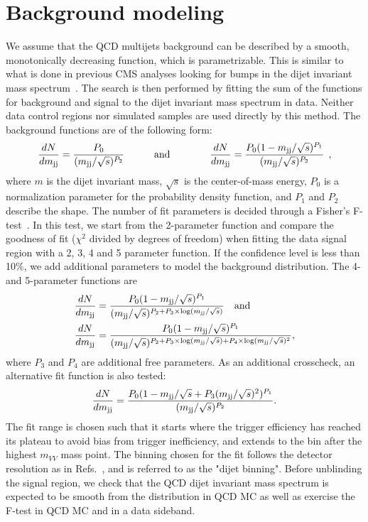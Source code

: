 \section{Background modeling}
\label{sec:searchI:bkg}
We assume that the QCD multijets background can be described by a smooth, monotonically decreasing function, which is parametrizable. This is similar to what is done in previous CMS analyses looking for bumps in the dijet invariant mass spectrum~\cite{Chatrchyan:2012ypy,CMS-PAS-EXO-12-059}. The search is then performed by fitting the sum of the functions for background and signal to the dijet invariant mass spectrum in data. Neither data control regions nor simulated samples are used directly by this method. The background functions are of the following form:
\begin{equation}
\label{eq:dijet1}
\frac{dN}{dm_\mathrm{jj}}= \frac{ P_0 } { (m_\mathrm{jj}/\sqrt{s})^{P_2} }\quad\quad\quad{\rm and}
\quad\quad\quad\quad
\frac{dN}{dm_\mathrm{jj}}= \frac{ P_0(1-m_\mathrm{jj}/\sqrt{s})^{P_1} } { (m_\mathrm{jj}/\sqrt{s})^{P_2} }\:\:,
\end{equation}
where $m$ is the dijet invariant mass, $\sqrt{s}$ is the center-of-mass energy, $P_0$ is a normalization parameter for the probability density function, and $P_1$ and $ P_2$ describe the shape. The number of fit parameters is decided through a Fisher's F-test~\cite{RePEc:bla:istatr:v:80:y:2012:i:3:p:491-491}. In this test, we start from the 2-parameter function and compare the goodness of fit ($\chi^2$ divided by degrees of freedom) when fitting the data signal region with a 2, 3, 4 and 5 parameter function. If the confidence level is less than 10\%, we add additional parameters to model the background distribution. The 4- and 5-parameter functions are
\begin{align}
\label{eq:dijet2}
\frac{dN}{d m_\mathrm{jj}} &= \frac{ P_0(1-m_\mathrm{jj}/\sqrt{s})^{P_1} } {(m_\mathrm{jj}/\sqrt{s})^{P_2+P_3\times\log(m_\mathrm{jj}/\sqrt{s})} }\quad{\rm and}\\
\frac{dN}{d m_\mathrm{jj}} &= \frac{ P_0(1-m_\mathrm{jj}/\sqrt{s})^{P_1} } {(m_\mathrm{jj}/\sqrt{s})^{P_2+P_3\times\log(m_\mathrm{jj}/\sqrt{s})+P_4\times\log(m_\mathrm{jj}/\sqrt{s})^2} },
\end{align}
where $P_3$ and $P_4$ are additional free parameters. As an additional crosscheck, an alternative fit function is also tested:
\begin{equation}
\label{eq:dijet4}
\frac{dN}{dm_\mathrm{jj}} = \frac{ P_0(1-m_\mathrm{jj} / \sqrt{s}+P_3(m_\mathrm{jj} / \sqrt{s})^2)^{P_1} } { (m_\mathrm{jj}/\sqrt{s})^{P_2} }.
\end{equation}
The fit range is chosen such that it starts where the trigger efficiency has reached its plateau to avoid bias from trigger inefficiency, and extends to the bin after the highest $m_{VV}$ mass point. The binning chosen for the fit follows the detector resolution as in Refs.~\cite{Chatrchyan:2012ypy,CMS-PAS-EXO-12-059}, and is referred to as the "dijet binning". Before unblinding the signal region, we check that the QCD dijet invariant mass spectrum is expected to be smooth from the distribution in QCD MC as well as exercise the F-test in QCD MC and in a data sideband.\par
